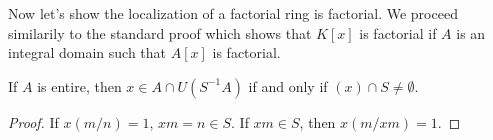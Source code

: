 
Now let's show the localization of a factorial ring is factorial. We proceed similarily to the standard proof which shows that $K[x]$ is factorial if $A$ is an integral domain such that $A[x]$ is factorial.

\begin{lemma}
    If $A$ is entire, then $x \in A \cap U(S^{-1}A)$ if and only if $(x) \cap S \neq \emptyset$.
\end{lemma}
\begin{proof}
    If $x (m/n) = 1$, $xm = n \in S$. If $xm \in S$, then $x (m/xm) = 1$.
\end{proof}

